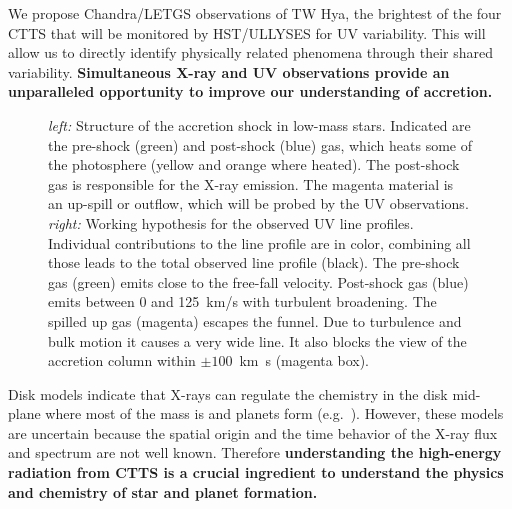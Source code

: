 \documentclass[letterpaper,11pt,twocolumn]{article}
\begin{document}
We propose Chandra/LETGS observations of TW Hya, the brightest of the four  CTTS that will be monitored by HST/ULLYSES for UV variability.
This will allow us to directly identify physically related phenomena through
their shared variability. {\bf Simultaneous X-ray and UV
observations provide an unparalleled opportunity to improve
our understanding of accretion.}


\begin{figure}[t]
\centering
{}
\caption{\label{fig:CIVsketch} \emph{left:} Structure of the accretion
  shock in low-mass stars. Indicated are the pre-shock (green) and
  post-shock (blue) gas, which heats some of the photosphere (yellow
  and orange where heated). The post-shock gas is responsible for the
  X-ray emission. The magenta material is an up-spill or outflow,
  which will be probed by the UV observations.  
  \emph{right:}
  Working hypothesis for the observed UV line profiles.
  Individual contributions to the line profile are in color, combining all those leads to the total observed line profile (black). 
  The pre-shock gas (green) emits close
  to the free-fall velocity. Post-shock gas (blue) emits
  between 0 and 125~km/s with turbulent broadening. The
  spilled up gas (magenta) escapes the funnel. Due to turbulence and bulk
  motion it causes a very wide line. It also blocks the view of
  the accretion column within $\pm100$~km~s (magenta box).
  }
\end{figure}



Disk models indicate that X-rays can regulate the chemistry in the disk mid-plane where most of the mass is and planets form (e.g.\ ). However, these models are uncertain because the spatial origin and the time behavior of the X-ray flux and spectrum are not well known.
Therefore
{\bf understanding the high-energy radiation from CTTS is a crucial ingredient to understand the physics and chemistry of star and planet formation.} 
\end{document}
